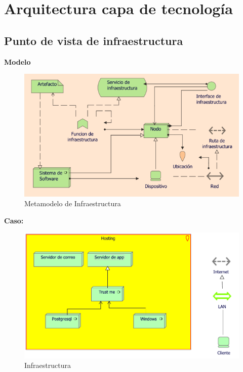 \section{Arquitectura capa de tecnología}

	\subsection{Punto de vista de infraestructura}
	{ 
		
		\textbf{Modelo}\\
		\begin{figure}[H]
			\centering
			\includegraphics[width=0.8\linewidth]{development/infraestructura.png}
			\caption{Metamodelo de Infraestructura}
		\end{figure}
	
		\textbf{Caso:}
		
		\begin{figure}[H]
			\centering
			\includegraphics[width=0.6\linewidth]{development/infraestructura.pdf}
			\caption{Infraestructura}
		\end{figure}
	}
	
